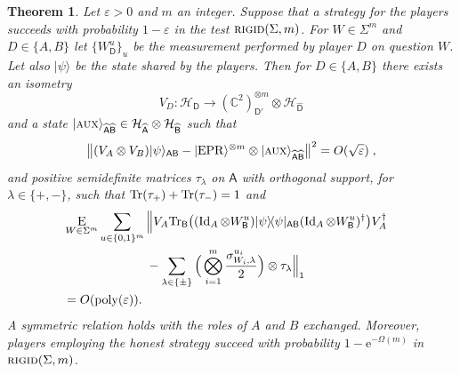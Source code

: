 \documentclass[11pt]{article}
\numberwithin{equation}{section}
\newtheorem{theorem}{Theorem}[section]
\theoremstyle{definition}
\theoremstyle{plain}
\newcommand{\C}{\mathbb C}
\newcommand{\eee}{\mathrm e}
\newcommand{\ket}[1]{|#1\rangle}
\newcommand{\bra}[1]{\langle#1|}
\newcommand{\proj}[1]{\ket{#1}\!\bra{#1}}
\newcommand{\Tr}{\mbox{\rm Tr}}
\newcommand{\Id}{\ensuremath{\mathop{\rm Id}\nolimits}}
\DeclareMathOperator{\poly}{poly}
\newcommand{\reg}[1]{{\textsf{#1}}}
\newcommand{\mH}{\mathcal{H}}
\newcommand{\eps}{\varepsilon}
\newcommand{\EPR}{{\rm EPR}}
\newcommand{\aux}{\textsc {aux}}
\newcommand{\rigid}{\textsc{rigid}}
\begin{document}
\begin{theorem}\label{thm:clifford-rigid}
Let $\eps>0$ and $m$ an integer. Suppose that a strategy for the players succeeds with probability $1-\eps$ in the test $\rigid(\Sigma,m)$. 
For $W\in\Sigma^m$ and $D\in\{A,B\}$ let $\{W^u_\reg{D}\}_u$ be the measurement performed by player $D$ on question $W$. Let also $\ket{\psi}$ be the state shared by the players.
Then for $D\in\{A,B\}$ there exists an isometry 
$$V_D: \mathcal{H}_\reg{D} \to (\C^2)^{\otimes m}_{\reg{D}'} \otimes {\mH}_{\widehat{\reg{D}}}$$
and a state  $\ket{\aux}_{\widehat{\reg{A}}\widehat{\reg{B}}} \in {\mH}_{\widehat{\reg{A}}}\otimes {\mH}_{\widehat{\reg{B}}}$
such that
\begin{equation}\label{eq:clifford-rigid-statement-1}
 \big\| (V_A \otimes V_B) \ket{\psi}_{\reg{AB}}  - \ket{\EPR}^{\otimes m} \otimes \ket{\aux}_{\widehat{\reg{A}}\widehat{\reg{B}}} \big\|^2 = O(\sqrt{\eps})\;,
\end{equation}
and positive semidefinite matrices $\tau_\lambda$ on $\widehat{\reg{A}}$ with orthogonal support, for $\lambda\in\{+,-\}$, such that $\Tr(\tau_+)+\Tr(\tau_-)=1$ and
\begin{align}
  &\mathop{\textsc{E}}_{W\in\Sigma^m} \sum_{u\in\{0,1\}^{m}} \Big\|V_A
  \Tr_{\reg{B}}\big((\Id_A \otimes W_{\reg{B}}^u) \proj{\psi}_{\reg{AB}} (\Id_A
  \otimes W_{\reg{B}}^u)^\dagger\big) V_A^\dagger \notag\\
  &\;\;\;\;\;\;\;\;\;\;\;\;\;\;\;\;\;\;\;\;\;\;\;\;- \sum_{\lambda\in\{\pm\}} \Big( \bigotimes_{i=1}^m \frac{\sigma_{W_{i},\lambda}^{u_{i}}}{2}\Big)\otimes \tau_\lambda  \Big\|_1\notag\\
  &= O(\poly(\eps)).&\label{eq:rigid-4}
\end{align}
A symmetric relation holds with the roles of $A$ and $B$ exchanged. 
Moreover, players employing the honest strategy succeed with probability
$1-\eee^{-\Omega(m)}$ in $\rigid(\Sigma,m)$.  
\end{theorem}
\end{document}
